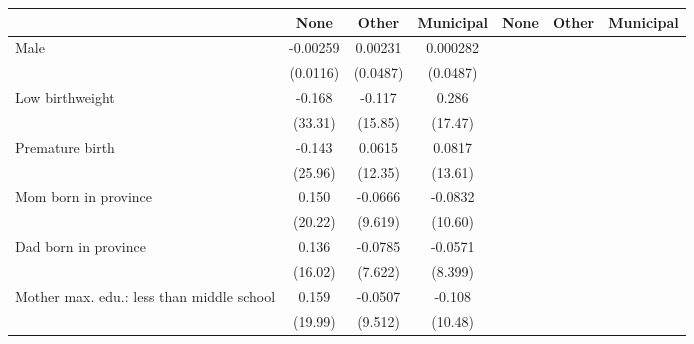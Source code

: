 {
\def\sym#1{\ifmmode^{#1}\else\(^{#1}\)\fi}
\begin{tabular}{l*{6}{c}}
\toprule
                    &\multicolumn{1}{c}{None}&\multicolumn{1}{c}{Other}&\multicolumn{1}{c}{Municipal}&\multicolumn{1}{c}{None}&\multicolumn{1}{c}{Other}&\multicolumn{1}{c}{Municipal}\\
\midrule
Male                &    -0.00259         &     0.00231         &    0.000282         &                     &                     &                     \\
                    &    (0.0116)         &    (0.0487)         &    (0.0487)         &                     &                     &                     \\
\addlinespace
Low birthweight     &      -0.168         &      -0.117         &       0.286         &                     &                     &                     \\
                    &     (33.31)         &     (15.85)         &     (17.47)         &                     &                     &                     \\
\addlinespace
Premature birth     &      -0.143         &      0.0615         &      0.0817         &                     &                     &                     \\
                    &     (25.96)         &     (12.35)         &     (13.61)         &                     &                     &                     \\
\addlinespace
Mom born in province&       0.150         &     -0.0666         &     -0.0832         &                     &                     &                     \\
                    &     (20.22)         &     (9.619)         &     (10.60)         &                     &                     &                     \\
\addlinespace
Dad born in province&       0.136         &     -0.0785         &     -0.0571         &                     &                     &                     \\
                    &     (16.02)         &     (7.622)         &     (8.399)         &                     &                     &                     \\
\addlinespace
Mother max. edu.: less than middle school&       0.159         &     -0.0507         &      -0.108         &                     &                     &                     \\
                    &     (19.99)         &     (9.512)         &     (10.48)         &                     &                     &                     \\

\end{tabular}}
